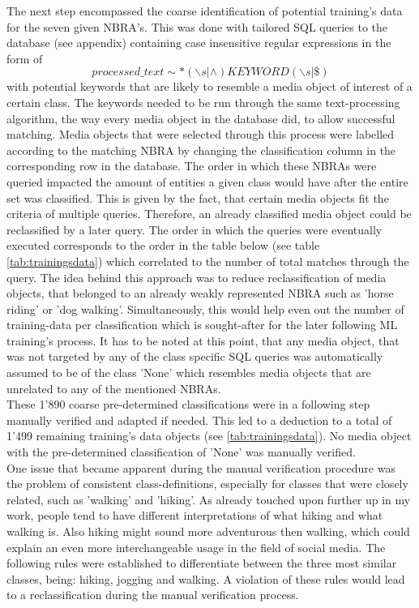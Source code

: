 \newline
The next step encompassed the coarse identification of potential training's data for the seven given NBRA's. This was done with tailored SQL queries to the database (see appendix) containing case insensitive regular expressions in the form of 
\[processed\_text \sim * (\backslash s | \wedge)KEYWORD(\backslash s | \$)\] with potential keywords that are likely to resemble a media object of interest of a certain class. The keywords needed to be run through the same text-processing algorithm, the way every media object in the database did, to allow successful matching. Media objects that were selected through this process were labelled according to the matching NBRA by changing the classification column in the corresponding row in the database. The order in which these NBRAs were queried impacted the amount of entities a given class would have after the entire set was classified. This is given by the fact, that certain media objects fit the criteria of multiple queries. Therefore, an already classified media object could be reclassified by a later query. The order in which the queries were eventually executed corresponds to the order in the table below (see table \ref{tab:trainingsdata}) which correlated to the number of total matches through the query. The idea behind this approach was to reduce reclassification of media objects, that belonged to an already weakly represented NBRA such as 'horse riding' or 'dog walking'. Simultaneously, this would help even out the number of training-data per classification which is sought-after for the later following ML training's process. It has to be noted at this point, that any media object, that was not targeted by any of the class specific SQL queries was automatically assumed to be of the class 'None' which resembles media objects that are unrelated to any of the mentioned NBRAs.\\
These 1'890 coarse pre-determined classifications were in a following step manually verified and adapted if needed. This led to a deduction to a total of 1'499 remaining training's data objects (see \ref{tab:trainingsdata}). No media object with the pre-determined classification of 'None' was manually verified.\\
\newline
One issue that became apparent during the manual verification procedure was the problem of consistent class-definitions, especially for classes that were closely related, such as 'walking' and 'hiking'. As already touched upon further up in my work, people tend to have different interpretations of what hiking and what walking is. Also hiking might sound more adventurous then walking, which could explain an even more interchangeable usage in the field of social media. The following rules were established to differentiate between the three most similar classes, being: hiking, jogging and walking. A violation of these rules would lead to a reclassification during the manual verification process.

